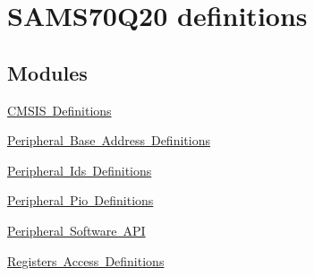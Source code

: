 \hypertarget{group__SAMS70Q20__definitions}{}\section{S\+A\+M\+S70\+Q20 definitions}
\label{group__SAMS70Q20__definitions}
\subsection*{Modules}
\begin{DoxyCompactItemize}
\item 
\mbox{\hyperlink{group__SAMS70Q20__cmsis}{C\+M\+S\+I\+S Definitions}}
\item 
\mbox{\hyperlink{group__SAMS70Q20__base}{Peripheral Base Address Definitions}}
\item 
\mbox{\hyperlink{group__SAMS70Q20__id}{Peripheral Ids Definitions}}
\item 
\mbox{\hyperlink{group__SAMS70Q20__pio}{Peripheral Pio Definitions}}
\item 
\mbox{\hyperlink{group__SAMS70Q20__api}{Peripheral Software A\+PI}}
\item 
\mbox{\hyperlink{group__SAMS70Q20__reg}{Registers Access Definitions}}
\end{DoxyCompactItemize}

